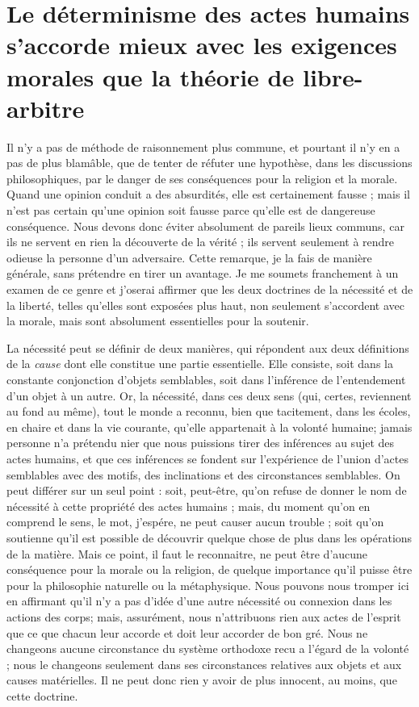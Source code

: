 
\section{Le déterminisme des actes humains s'accorde mieux avec les exigences morales que la théorie de libre-arbitre}

Il n’y a pas de méthode de raisonnement plus commune,
et pourtant il n’y en a pas de plus blamâble, que de tenter
de réfuter une hypothèse, dans les discussions philosophiques,
par le danger de ses conséquences pour la religion
et la morale. Quand une opinion conduit a des absurdités,
elle est certainement fausse ; mais il n’est pas certain
qu’une opinion soit fausse parce qu’elle est de dangereuse
conséquence. Nous devons donc éviter absolument de
pareils lieux communs, car ils ne servent en rien la découverte
de la vérité ; ils servent seulement à rendre odieuse
la personne d’un adversaire. Cette remarque, je la fais
de manière générale, sans prétendre en tirer un avantage.
Je me soumets franchement à un examen de ce genre et
j’oserai affirmer que les deux doctrines de la nécessité et
de la liberté, telles qu’elles sont exposées plus haut, non
seulement s’accordent avec la morale, mais sont absolument
essentielles pour la soutenir.

La nécessité peut se définir de deux manières, qui répondent
aux deux définitions de la {\it cause} dont elle constitue
une partie essentielle. Elle consiste, soit dans la constante
conjonction d’objets semblables, soit dans l’inférence de
l'entendement d’un objet à un autre. Or, la nécessité,
dans ces deux sens (qui, certes, reviennent au fond au
même), tout le monde a reconnu, bien que tacitement,
dans les écoles, en chaire et dans la vie courante, qu’elle
appartenait à la volonté humaine; jamais personne n’a
prétendu nier que nous puissions tirer des inférences au
sujet des actes humains, et que ces inférences se fondent
sur l'expérience de l’union d’actes semblables avec des
motifs, des inclinations et des circonstances semblables.
On peut différer sur un seul point : soit, peut-être, qu’on
refuse de donner le nom de nécessité à cette propriété des
actes humains ; mais, du moment qu’on en comprend le
sens, le mot, j’espére, ne peut causer aucun trouble ; soit
qu’on soutienne qu’il est possible de découvrir quelque
chose de plus dans les opérations de la matière. Mais ce
point, il faut le reconnaitre, ne peut être d’aucune conséquence
pour la morale ou la religion, de quelque importance
qu’il puisse être pour la philosophie naturelle ou la
métaphysique. Nous pouvons nous tromper ici en affirmant
qu’il n’y a pas d’idée d’une autre nécessité ou
connexion dans les actions des corps; mais, assurément,
nous n’attribuons rien aux actes de l'esprit que ce que
chacun leur accorde et doit leur accorder de bon gré. Nous
ne changeons aucune circonstance du système orthodoxe
recu a l'égard de la volonté ; nous le changeons seulement
dans ses circonstances relatives aux objets et aux causes
matérielles. Il ne peut donc rien y avoir de plus innocent,
au moins, que cette doctrine.

